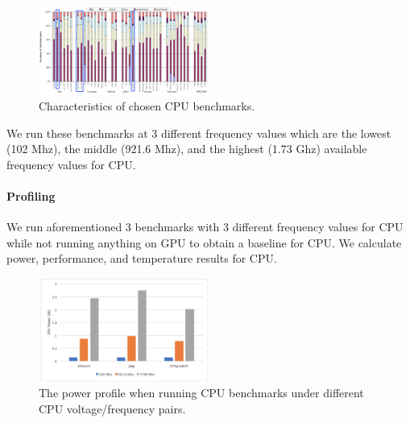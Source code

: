 \begin{figure}
  \caption{Characteristics of chosen CPU benchmarks.}
  \centering
    \includegraphics[width=0.5\textwidth]{cpubench}
\end{figure}

We run these benchmarks at 3 different frequency values which are the lowest (102 Mhz), the middle (921.6 Mhz), and the highest (1.73 Ghz) available frequency values for CPU. 

\paragraph{Profiling}


We run aforementioned 3 benchmarks with 3 different frequency values for CPU while not running anything on GPU to obtain a baseline for CPU. We calculate power, performance, and temperature results for CPU. 

\begin{figure}[h]
    \centering
    \includegraphics[width=0.5\textwidth]{cpupower.png}
    \caption{The power profile when running CPU benchmarks under different CPU voltage/frequency pairs.}\label{fig:cpupower}
\end{figure}

